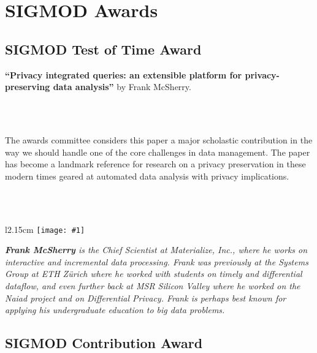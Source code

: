 
\newcommand{\personphoto}[1]{{\texttt{[image: \#1]}}}
\newcommand{\awardedpaper}[2]{ {\centering \textbf{``#1''}} by {\centering #2.}}
\newcommand{\quot}[2]{{\vspace{2mm}``\emph{#1}''}}
\newcommand{\person}[4]{~\\~
\begin{minipage}{\textwidth}
\begin{wrapfigure}[10]{l}{2.15cm}
\vspace*{-1.2\baselineskip}%
\personphoto{#4}
\end{wrapfigure}
\emph{\small #3}
\end{minipage}
}

\ifodd\value{page}\hbox{}\newpage\fi


\section{SIGMOD Awards}

\subsection*{SIGMOD Test of Time Award}

\awardedpaper{Privacy integrated queries: an extensible platform for privacy-preserving data analysis}{Frank McSherry}

~\\~

The awards committee considers this paper a major scholastic contribution
in the way we should handle one of the core challenges in  data management. The paper
has become a landmark reference for research on a privacy preservation in these modern
times geared at automated data analysis with privacy implications.


\person{Frank McSherry}{Materialize, Inc.}{\textbf{Frank McSherry} is the Chief Scientist at Materialize, Inc., where he works on interactive and incremental data processing. Frank was previously at the Systems Group at ETH Z\"urich where he worked with students on timely and differential dataflow, and even further back at MSR Silicon Valley where he worked on the Naiad project and on Differential Privacy. Frank is perhaps best known for applying his undergraduate education to big data problems.}{images/awards/mcsherry.jpg}

\subsection*{SIGMOD Contribution Award}

